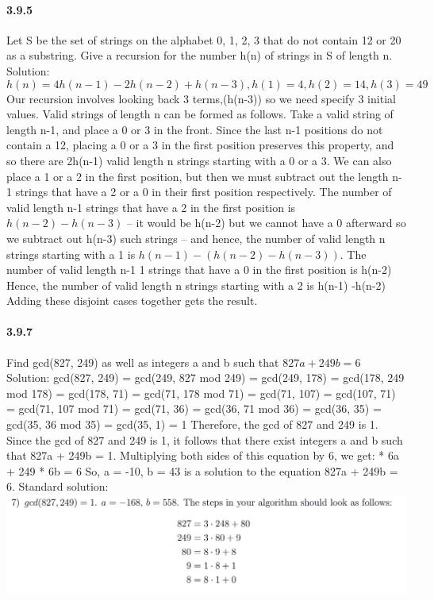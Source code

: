 \documentclass{article}
\begin{document}
\paragraph{3.9.5}
Let S be the set of strings on the alphabet {0, 1, 2, 3} that do not contain 12 or 20 as
a substring. Give a recursion for the number h(n) of strings in S of length n.\newline
Solution:\newline
$$h(n)=4h(n-1)-2h(n-2)+h(n-3),h(1)=4,h(2)=14,h(3)=49$$
Our recursion
involves looking back 3 terms,(h(n-3)) so we need specify 3 initial values. Valid strings
of length n can be formed as follows. Take a valid string of length n-1, and place a 0 or 3
in the front. Since the last n-1 positions do not contain a 12, placing a 0 or a 3 in the first
position preserves this property, and so there are 2h(n-1) valid length n strings starting with
a 0 or a 3. We can also place a 1 or a 2 in the first position, but then we must subtract out
the length n-1  strings that have a 2 or a 0 in their first position respectively. The number of
valid length n-1 strings that have a 2 in the first position is $h(n-2)-h(n-3)$ – it would
be h(n-2) but we cannot have a 0 afterward so we subtract out h(n-3) such strings – and
hence, the number of valid length n strings starting with a 1 is $h(n-1)-(h(n-2)-h(n-3))$. The number of valid length n-1 1 strings that have a 0 in the first position is h(n-2) Hence,
the number of valid length n strings starting with a 2 is h(n-1) -h(n-2) Adding these
disjoint cases together gets the result.
\paragraph{3.9.7}
Find gcd(827, 249) as well as integers a and b such that $827a + 249b=6$\newline
Solution:\newline
gcd(827, 249) = gcd(249, 827 mod 249) = gcd(249, 178) = gcd(178, 249 mod 178) = gcd(178, 71) = gcd(71, 178 mod 71) = gcd(71, 107) = gcd(107, 71) = gcd(71, 107 mod 71) = gcd(71, 36) = gcd(36, 71 mod 36) = gcd(36, 35) = gcd(35, 36 mod 35) = gcd(35, 1) = 1 \newline
Therefore, the gcd of 827 and 249 is 1. \newline
Since the gcd of 827 and 249 is 1, it follows that there exist integers a and b such that 827a + 249b = 1. Multiplying both sides of this equation by 6, we get: * 6a + 249 * 6b = 6\newline
So, a = -10, b = 43 is a solution to the equation 827a + 249b = 6.
Standard solution:\newline
\includegraphics{0008}
\end{document}
